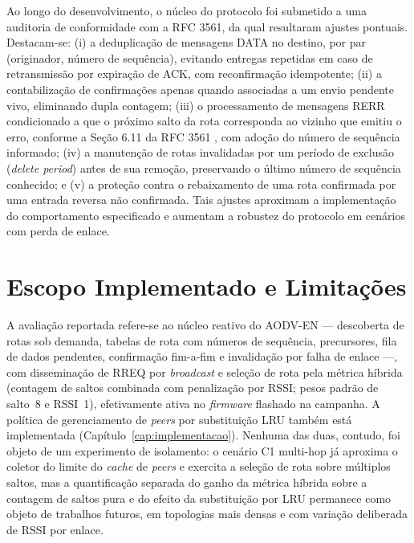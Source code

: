 Ao longo do desenvolvimento, o núcleo do protocolo foi submetido a uma
auditoria de conformidade com a RFC 3561, da qual resultaram ajustes
pontuais. Destacam-se: (i) a deduplicação de mensagens DATA no destino,
por par (originador, número de sequência), evitando entregas repetidas
em caso de retransmissão por expiração de ACK, com reconfirmação
idempotente; (ii) a contabilização de confirmações apenas quando
associadas a um envio pendente vivo, eliminando dupla contagem; (iii) o
processamento de mensagens RERR condicionado a que o próximo salto da
rota corresponda ao vizinho que emitiu o erro, conforme a Seção 6.11 da
RFC 3561 \cite{perkins2003}, com adoção do número de sequência informado; (iv) a manutenção de
rotas invalidadas por um período de exclusão (\emph{delete period})
antes de sua remoção, preservando o último número de sequência
conhecido; e (v) a proteção contra o rebaixamento de uma rota confirmada
por uma entrada reversa não confirmada. Tais ajustes aproximam a
implementação do comportamento especificado e aumentam a robustez do
protocolo em cenários com perda de enlace.

\section{Escopo Implementado e
Limitações}\label{escopo-implementado-e-limitauxe7uxf5es}

A avaliação reportada refere-se ao núcleo reativo do AODV-EN ---
descoberta de rotas sob demanda, tabelas de rota com números de
sequência, precursores, fila de dados pendentes, confirmação fim-a-fim e
invalidação por falha de enlace ---, com disseminação de RREQ por
\emph{broadcast} e seleção de rota pela métrica híbrida (contagem de saltos
combinada com penalização por RSSI; pesos padrão de salto~8 e RSSI~1),
efetivamente ativa no \emph{firmware} flashado na campanha. A política de
gerenciamento de \emph{peers} por substituição LRU também está implementada
(Capítulo~\ref{cap:implementacao}). Nenhuma das duas, contudo, foi objeto de
um experimento de isolamento: o cenário C1 multi-hop já aproxima o coletor do
limite do \emph{cache} de \emph{peers} e exercita a seleção de rota sobre
múltiplos saltos, mas a quantificação separada do ganho da métrica híbrida
sobre a contagem de saltos pura e do efeito da substituição por LRU permanece
como objeto de trabalhos futuros, em topologias mais densas e com variação
deliberada de RSSI por enlace.


